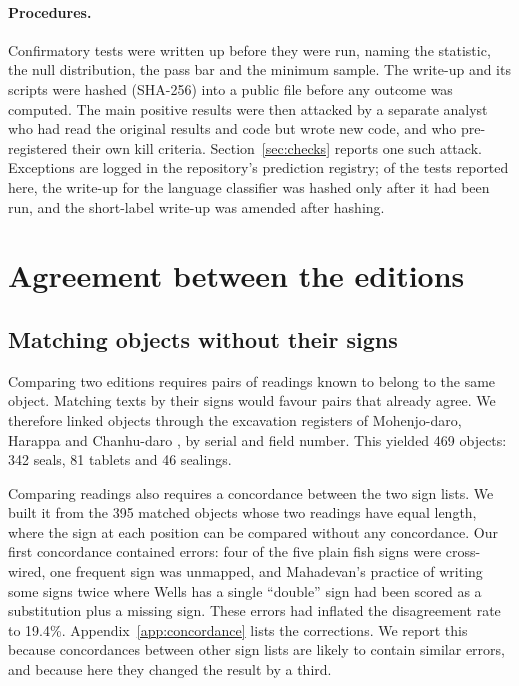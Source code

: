 \documentclass[11pt,a4paper]{article}
\begin{document}
\paragraph{Procedures.} Confirmatory tests were written up before they were run, naming the statistic, the null distribution, the pass bar and the minimum sample. The write-up and its scripts were hashed (SHA-256) into a public file before any outcome was computed. The main positive results were then attacked by a separate analyst who had read the original results and code but wrote new code, and who pre-registered their own kill criteria. Section~\ref{sec:checks} reports one such attack. Exceptions are logged in the repository's prediction registry; of the tests reported here, the write-up for the language classifier was hashed only after it had been run, and the short-label write-up was amended after hashing.

\section{Agreement between the editions}
\label{sec:editions}

\subsection{Matching objects without their signs}

Comparing two editions requires pairs of readings known to belong to the same object. Matching texts by their signs would favour pairs that already agree. We therefore linked objects through the excavation registers of Mohenjo-daro, Harappa and Chanhu-daro \citep{mackay1938,vats1940,mackay1943}, by serial and field number. This yielded 469 objects: 342 seals, 81 tablets and 46 sealings.

Comparing readings also requires a concordance between the two sign lists. We built it from the 395 matched objects whose two readings have equal length, where the sign at each position can be compared without any concordance. Our first concordance contained errors: four of the five plain fish signs were cross-wired, one frequent sign was unmapped, and Mahadevan's practice of writing some signs twice where Wells has a single ``double'' sign had been scored as a substitution plus a missing sign. These errors had inflated the disagreement rate to 19.4\%. Appendix~\ref{app:concordance} lists the corrections. We report this because concordances between other sign lists are likely to contain similar errors, and because here they changed the result by a third.
\end{document}
